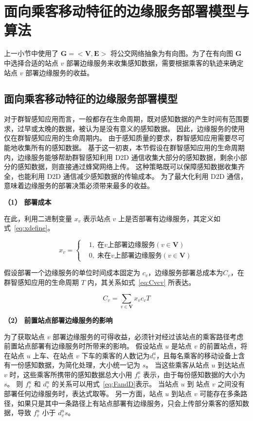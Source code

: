 \section{面向乘客移动特征的边缘服务部署模型与算法}

上一小节中使用了 $\boldsymbol{G}=<\boldsymbol{V}, \boldsymbol{E}>$ 将公交网络抽象为有向图。为了在有向图 $\boldsymbol{G}$ 中选择合适的站点 $v$ 部署边缘服务来收集感知数据，需要根据乘客的轨迹来确定站点 $v$ 部署边缘服务的收益。

\subsection{面向乘客移动特征的边缘服务部署模型}

对于群智感知应用而言，一般都存在生命周期，既对感知数据的产生时间有范围要求，过早或太晚的数据，被认为是没有意义的感知数据。
因此，边缘服务的使用仅在群智感知应用的生命周期内。
由于感知质量的要求，群智感知应用需要尽可能地收集所有的感知数据。
基于这一初衷，本节假设在群智感知应用的生命周期内，边缘服务能够帮助群智感知利用 D2D 通信收集大部分的感知数据，剩余小部分的感知数据，则直接通过蜂窝网络上传。
这种策略既可以保障感知数据收集齐全，也能利用 D2D 通信减少感知数据的传输成本。
为了最大化利用 D2D 通信，意味着边缘服务的部署决策必须带来最多的收益。

\textbf{（1） 部署成本}

在此，利用二进制变量 $x_v$ 表示站点 $v$ 上是否部署有边缘服务，其定义如式~\eqref{eq:xdefine}。

\begin{equation}
\label{eq:xdefine}
x_v =\left\{
\begin{aligned}
&1, \; 在 v 上部署边缘服务 (v\in \boldsymbol{V})\\
&0, \; 未在 v 上部署边缘服务 (v\in \boldsymbol{V})
\end{aligned}
\right.
\end{equation}

假设部署一个边缘服务的单位时间成本固定为 $c_v$，边缘服务部署总成本为$C_v$，在群智感知应用的生命周期 $T$ 内，其关系如式~\eqref{eq:Cvcv} 所表达。

\begin{equation}
\label{eq:Cvcv}
C_v = \sum_{v\in \boldsymbol{V}}x_v c_v T
\end{equation}

\textbf{（2） 前置站点部署边缘服务的影响}

为了获取站点 $v$ 部署边缘服务的可得收益，必须针对经过该站点的乘客路径考虑前置站点部署有边缘服务时所带来的影响。
假设站点 $u$ 是站点 $v$ 的前置站点，将在站点 $u$ 上车、在站点 $v$ 下车的乘客的人数记为$d^u_v$，且每名乘客的移动设备上含有一份感知数据，为简化处理，大小统一记为 $s$。
当这些乘客从站点 $u$ 到达站点 $v$ 时，这些乘客所携带的感知数据总大小用 $f^u_v$ 表示，由于每份感知数据的大小为 $s$。
则 $f^u_v$ 和 $d^u_v$ 的关系可以用式~\eqref{eq:FandD}表示。
当站点 $u$ 到 站点 $v$ 之间没有部署任何边缘服务时，表达式取等。
另一方面，站点 $u$ 到站点 $v$ 可能存在多条路径，如果只是其中一条路径上有站点部署有边缘服务，只会上传部分乘客的感知数据，导致 $f^u_v$ 小于 $d^u_v s$。

